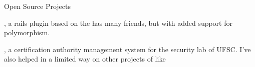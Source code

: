 \begin{rubric}{Open Source Projects} 

\entry* 
    \textbf{}, a rails
    plugin based on the has many friends, but with added support for
    polymorphism.

\entry* 
    \textbf{}, a
    certification authority management system for the security lab of UFSC. I've
    also helped in a limited way on other projects of
    like 

\end{rubric}
